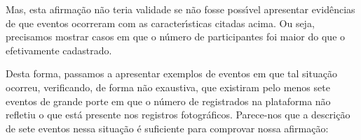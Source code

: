 \documentclass[
12pt,		%
openright,	%
twoside,  %
a4paper,			%
chapter=TITLE,		%
english,			%
french,				%
spanish,			%
brazil				%
]{USPSC-classe/USPSC}
\begin{document}
Mas, esta afirma\c{c}\~ao n\~ao teria validade se n\~ao fosse poss\'{\i}vel apresentar evid\^encias de que eventos ocorreram com as caracter\'{\i}sticas citadas acima. Ou seja, precisamos mostrar casos em que o n\'umero de participantes foi maior do que o efetivamente cadastrado.

















Desta forma, passamos a apresentar exemplos de eventos em que tal situa\c{c}\~ao ocorreu, verificando, de forma n\~ao exaustiva, que existiram pelo menos sete eventos de grande porte em que o n\'umero de registrados na plataforma n\~ao refletiu o que est\'a presente nos registros fotogr\'aficos. Parece-nos que a descri\c{c}\~ao de sete eventos nessa situa\c{c}\~ao \'e suficiente para comprovar nossa afirma\c{c}\~ao:
\end{document}
